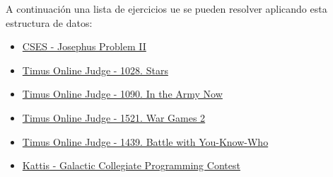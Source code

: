 A continuación una lista de ejercicios ue se pueden resolver aplicando esta estructura de datos:
\begin{itemize}
	\item \href{https://cses.fi/problemset/task/2163}{CSES - Josephus Problem II}
	\item \href{http://acm.timus.ru/problem.aspx?space=1&num=1028}{Timus Online Judge - 1028. Stars}
	\item \href{http://acm.timus.ru/problem.aspx?space=1&num=1090}{Timus Online Judge - 1090. In the Army Now}
	\item \href{http://acm.timus.ru/problem.aspx?space=1&num=1521}{Timus Online Judge - 1521. War Games 2}
	\item \href{http://acm.timus.ru/problem.aspx?space=1&num=1439}{Timus Online Judge - 1439. Battle with You-Know-Who}
	\item \href{https://open.kattis.com/problems/gcpc}{Kattis - Galactic Collegiate Programming Contest}
\end{itemize}